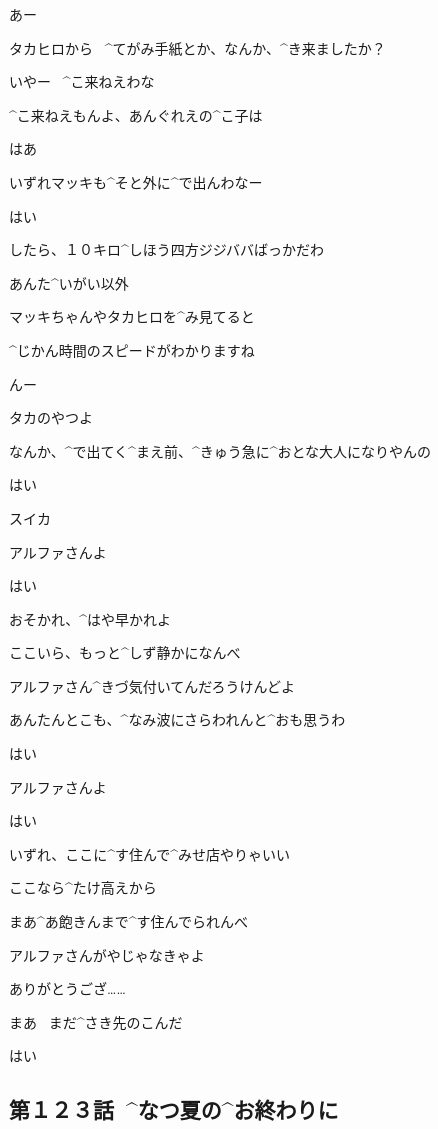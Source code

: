\Ojisan あー

\page[25]
\Alpha タカヒロから
\ ^{てがみ}{手紙}とか、なんか、^{き}{来}ましたか？

\Ojisan いやー
\ ^{こ}{来}ねえわな

\Ojisan ^{こ}{来}ねえもんよ、あんぐれえの^{こ}{子}は

\Alpha はあ

\page[26]
\Ojisan いずれマッキも^{そと}{外}に^{で}{出}んわなー

\Alpha はい

\Ojisan したら、１０キロ^{しほう}{四方}ジジババばっかだわ

\Ojisan あんた^{いがい}{以外}

\page[27]
\Alpha マッキちゃんやタカヒロを^{み}{見}てると

\Alpha ^{じかん}{時間}のスピードがわかりますね

\Ojisan んー

\Ojisan タカのやつよ

\Ojisan なんか、^{で}{出}てく^{まえ}{前}、^{きゅう}{急}に^{おとな}{大人}になりやんの

\page[28]
\Alpha はい

\Sign スイカ

\page[29]
\Ojisan アルファさんよ

\Alpha はい

\Ojisan おそかれ、^{はや}{早}かれよ

\Ojisan ここいら、もっと^{しず}{静}かになんべ

\page[30]
\Ojisan アルファさん^{きづ}{気付}いてんだろうけんどよ

\Ojisan あんたんとこも、^{なみ}{波}にさらわれんと^{おも}{思}うわ

\Alpha はい

\page[31]
\Ojisan アルファさんよ

\Alpha はい

\Ojisan いずれ、ここに^{す}{住}んで^{みせ}{店}やりゃいい

\Ojisan ここなら^{たけ}{高}えから

\Ojisan まあ^{あ}{飽}きんまで^{す}{住}んでられんべ

\page[32]
\Ojisan アルファさんがやじゃなきゃよ

\Alpha ありがとうござ……

\page[34]
\Ojisan まあ
\ まだ^{さき}{先}のこんだ

\Alpha はい


\subsection{第１２３話\ ^{なつ}{夏}の^{お}{終}わりに}

